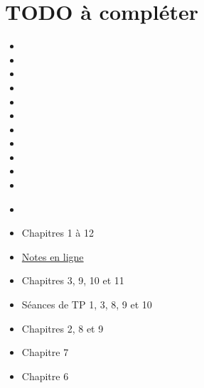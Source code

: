\section{TODO à compléter \textcolor{red}{\danger}}
\begin{itemize}
  \item {}
  \item {}
  \item {}
  \item {}
  \item {}
  \item {}
  \item {}
  \item {}
  \item {}
  \item {}
  \item {}
  \item {}\\
\end{itemize}
\noindent
{}
  \begin{itemize}
    \item Chapitres 1 à 12
    \item \href{https://dl.dropboxusercontent.com/u/44092863/Graph_Theory_Romain_Capron.pdf}{Notes en ligne}
  \end{itemize}
  \begin{itemize}
    \item Chapitres 3, 9, 10 et 11
    \item Séances de TP 1, 3, 8, 9 et 10
  \end{itemize}
  \begin{itemize}
    \item Chapitres 2, 8 et 9
  \end{itemize}
  \begin{itemize}
    \item Chapitre 7
  \end{itemize}
  \begin{itemize}
    \item Chapitre 6
  \end{itemize}
